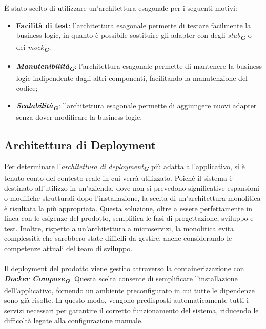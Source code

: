È stato scelto di utilizzare un'architettura esagonale per i seguenti motivi:
\begin{itemize}
    \item \textbf{Facilità di test}: l'architettura esagonale permette di testare facilmente la business logic, in quanto è possibile sostituire gli adapter con degli \emph{stub}\textsubscript{\textbf{\textit{G}}} o dei \emph{mock}\textsubscript{\textbf{\textit{G}}};
    \item \textbf{\emph{Manutenibilità}}\textsubscript{\textbf{\textit{G}}}: l'architettura esagonale permette di mantenere la business logic indipendente dagli altri componenti, facilitando la manutenzione del codice;
    \item \textbf{\emph{Scalabilità}}\textsubscript{\textbf{\textit{G}}}: l'architettura esagonale permette di aggiungere nuovi adapter senza dover modificare la business logic.
\end{itemize}


\subsection{Architettura di Deployment}
\label{sec:architettura_deployment}

Per determinare l'\emph{architettura di deployment}\textsubscript{\textbf{\textit{G}}} più adatta all'applicativo, si è tenuto conto del contesto reale in cui verrà utilizzato. Poiché il sistema è destinato all'utilizzo in un'azienda, dove non si prevedono significative espansioni o modifiche strutturali dopo l'installazione, la scelta di un'architettura monolitica è risultata la più appropriata. Questa soluzione, oltre a essere perfettamente in linea con le esigenze del prodotto, semplifica le fasi di progettazione, sviluppo e test. Inoltre, rispetto a un'architettura a microservizi, la monolitica evita complessità che sarebbero state difficili da gestire, anche considerando le competenze attuali del team di sviluppo.\\\\
Il deployment del prodotto viene gestito attraverso la containerizzazione con \textbf{\emph{Docker Compose}}\textsubscript{\textbf{\textit{G}}}. Questa scelta consente di semplificare l’installazione dell’applicativo, fornendo un ambiente preconfigurato in cui tutte le dipendenze sono già risolte. In questo modo, vengono predisposti automaticamente tutti i servizi necessari per garantire il corretto funzionamento del sistema, riducendo le difficoltà legate alla configurazione manuale.



